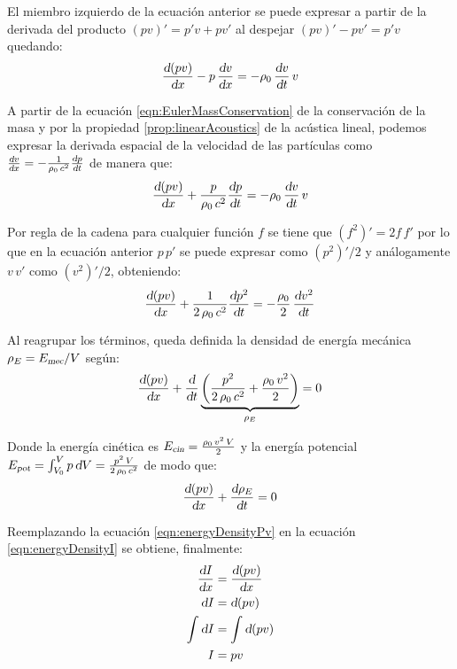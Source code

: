 \documentclass[a5paper,12pt,twoside]{book}
\begin{document}
El miembro izquierdo de la ecuación anterior se puede expresar a partir de la derivada del producto $(pv)'=p'v+pv'$ al despejar $(pv)'-pv'=p'v$ quedando:
\begin{equation*}
    \frac{\textsl{d} (pv)}{\textsl{d} x} - p \, \frac{\textsl{d} v}{\textsl{d} x} = - \rho_0 \, \frac{\textsl{d} v}{\textsl{d} t} \, v
\end{equation*}

A partir de la ecuación \ref{eqn:EulerMassConservation} de la conservación de la masa y por la propiedad \ref{prop:linearAcoustics} de la acústica lineal, podemos expresar la derivada espacial de la velocidad de las partículas como $\tfrac{\textsl{d} v}{\textsl{d} x} = - \tfrac{1}{\rho_0 \, c^2} \tfrac{\textsl{d} p}{\textsl{d} t}$ de manera que:
\begin{equation*}
    \frac{\textsl{d} (pv)}{\textsl{d} x} + \frac{p}{\rho_0 \, c^2} \frac{\textsl{d} p}{\textsl{d} t} = - \rho_0 \, \frac{\textsl{d} v}{\textsl{d} t} \, v
\end{equation*}

Por regla de la cadena para cualquier función $f$ se tiene que $(f^2)'=2f \, f'$ por lo que en la ecuación anterior $p \, p'$ se puede expresar como $(p^2)'/2$ y análogamente $v \, v'$ como $(v^2)'/2$, obteniendo:
\begin{equation*}
    \frac{\textsl{d} (pv)}{\textsl{d} x} + \frac{1}{2 \, \rho_0 \, c^2} \frac{\textsl{d} p^2}{\textsl{d} t} = - \frac{\rho_0}{2} \, \frac{\textsl{d} v^2}{\textsl{d} t}
\end{equation*}

Al reagrupar los términos, queda definida la densidad de energía mecánica $\rho_E={{E}_\textsl{{mec}}}/V$ según:
\begin{equation*}
    \frac{\textsl{d} (pv)}{\textsl{d} x} + \frac{\textsl{d}}{\textsl{d} t}  \underbrace{\left( \frac{p^2}{2 \, \rho_0 \, c^2} + \frac{\rho_0 \, v^2}{2} \right)}_{\rho_E}  = 0
\end{equation*}

Donde la energía cinética es ${{E}_\textsl{{cin}}} = \tfrac{\rho_0 \, v^2 \, V}{2}$ y la energía potencial ${{E}_\textsl{{pot}}} = \int_{V_0}^V p \, \textsl{d} V = \tfrac{p^2 \, V}{2 \, \rho_0 \, c^2}$ de modo que:
\begin{equation}
    \frac{\textsl{d} (pv)}{\textsl{d} x} + \frac{\textsl{d} \rho_E}{\textsl{d} t} = 0
    \label{eqn:energyDensityPv}
\end{equation}


Reemplazando la ecuación \ref{eqn:energyDensityPv} en la ecuación \ref{eqn:energyDensityI} se obtiene, finalmente:
\begin{align*}
    \frac{\textsl{d} I}{\textsl{d} x} &= \frac{\textsl{d} (pv)}{\textsl{d} x}
    \\
    \textsl{d} I &= \textsl{d} (pv)
    \\
    \int \textsl{d} I &= \int \textsl{d} (pv)
    \\
    I &= pv
\end{align*}
\end{document}
